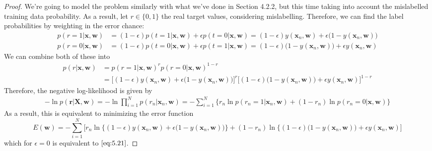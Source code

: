 \begin{proof}
    We're going to model the problem similarly with what we've done in
    Section 4.2.2, but this time taking into account the mislabelled training data
    probability. As a result, let $r \in \{0, 1\}$ the real target values, considering
    mislabelling. Therefore, we can find the label probabilities by weighting in the error
    chance:
    \begin{align*}
        p(r = 1 | \mathbf{x}, \mathbf{w}) 
        &= (1 - \epsilon)p(t = 1 | \mathbf{x}, \mathbf{w}) 
        + \epsilon p(t = 0 | \mathbf{x}, \mathbf{w})
        = (1 - \epsilon)y(\mathbf{x}_n, \mathbf{w}) 
        + \epsilon \big(1 - y(\mathbf{x}_n, \mathbf{w})\big)
    \end{align*}
    \vspace{-2em}
    \begin{align*}
        p(r = 0 | \mathbf{x}, \mathbf{w}) 
        &= (1 - \epsilon)p(t = 0 | \mathbf{x}, \mathbf{w}) 
        + \epsilon p(t = 1 | \mathbf{x}, \mathbf{w})
        = (1 - \epsilon)\big(1 - y(\mathbf{x}_n, \mathbf{w})\big) 
        + \epsilon y(\mathbf{x}_n, \mathbf{w})
    \end{align*}
    We can combine both of these into
    \begin{align*}
        p(r | \mathbf{x}, \mathbf{w}) 
        &= p(r = 1 | \mathbf{x}, \mathbf{w})^r p(r = 0 | \mathbf{x}, \mathbf{w})^{1 - r} \\
        &= \big[(1 - \epsilon)y(\mathbf{x}_n, \mathbf{w}) + \epsilon \big(1 - y(\mathbf{x}_n, \mathbf{w})\big)\big]^r
        \big[(1 - \epsilon)\big(1 - y(\mathbf{x}_n, \mathbf{w})\big) 
        + \epsilon y(\mathbf{x}_n, \mathbf{w})\big]^{1 - r}
    \end{align*}
    Therefore, the negative log-likelihood is given by
    \begin{align*}
        - \ln p(\mathbf{r} | \mathbf{\mathbf{X}}, \mathbf{w})
        = - \ln \prod_{i=1}^N p(r_n | \mathbf{x}_n, \mathbf{w})
        = - \sum_{i=1}^{N} \{r_n \ln p(r_n = 1 | \mathbf{x}_n, \mathbf{w}) 
            + (1 - r_n) \ln p(r_n = 0 | \mathbf{x}, \mathbf{w})\} 
    \end{align*}
    As a result, this is equivalent to minimizing the error function
    \[
        E(\mathbf{w}) = -\sum_{i=1}^{N} 
        \big[r_n \ln\big\{(1 - \epsilon)y(\mathbf{x}_n, \mathbf{w}) 
            + \epsilon\big(1 - y(\mathbf{x}_n, \mathbf{w})\big)\big\}
            + (1 - r_n) \ln\big\{(1 - \epsilon)\big(1 - y(\mathbf{x}_n, \mathbf{w})\big)
            + \epsilon y(\mathbf{x}_n, \mathbf{w})\big]
    \] 
    which for $\epsilon = 0$ is equivalent to $\eqref{eq:5.21}$.
\end{proof}

